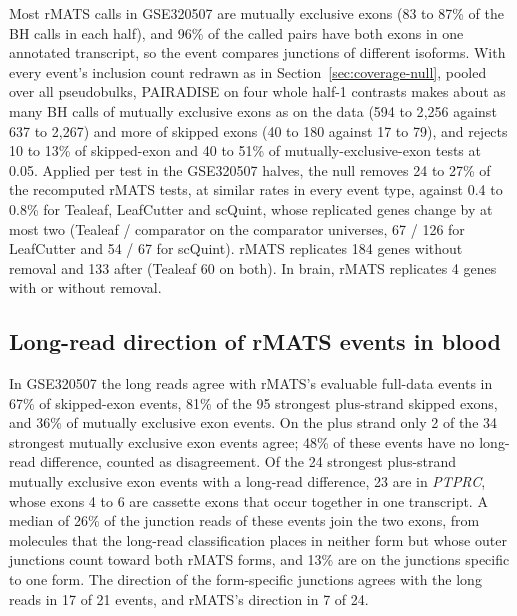 \documentclass[11pt]{article}
\begin{document}
Most rMATS calls in GSE320507 are mutually exclusive exons (83 to 87\% of the BH calls in each half), and 96\% of the called pairs have both exons in one annotated transcript, so the event compares junctions of different isoforms. With every event's inclusion count redrawn as in Section~\ref{sec:coverage-null}, pooled over all pseudobulks, PAIRADISE on four whole half-1 contrasts makes about as many BH calls of mutually exclusive exons as on the data (594 to 2{,}256 against 637 to 2{,}267) and more of skipped exons (40 to 180 against 17 to 79), and rejects 10 to 13\% of skipped-exon and 40 to 51\% of mutually-exclusive-exon tests at 0.05. Applied per test in the GSE320507 halves, the null removes 24 to 27\% of the recomputed rMATS tests, at similar rates in every event type, against 0.4 to 0.8\% for Tealeaf, LeafCutter and scQuint, whose replicated genes change by at most two (Tealeaf / comparator on the comparator universes, 67 / 126 for LeafCutter and 54 / 67 for scQuint). rMATS replicates 184 genes without removal and 133 after (Tealeaf 60 on both). In brain, rMATS replicates 4 genes with or without removal.

\subsection{Long-read direction of rMATS events in blood}
\label{sec:rmats-lr}

In GSE320507 the long reads agree with rMATS's evaluable full-data events in 67\% of skipped-exon events, 81\% of the 95 strongest plus-strand skipped exons, and 36\% of mutually exclusive exon events. On the plus strand only 2 of the 34 strongest mutually exclusive exon events agree; 48\% of these events have no long-read difference, counted as disagreement. Of the 24 strongest plus-strand mutually exclusive exon events with a long-read difference, 23 are in \emph{PTPRC}, whose exons 4 to 6 are cassette exons that occur together in one transcript. A median of 26\% of the junction reads of these events join the two exons, from molecules that the long-read classification places in neither form but whose outer junctions count toward both rMATS forms, and 13\% are on the junctions specific to one form. The direction of the form-specific junctions agrees with the long reads in 17 of 21 events, and rMATS's direction in 7 of 24.
\end{document}
